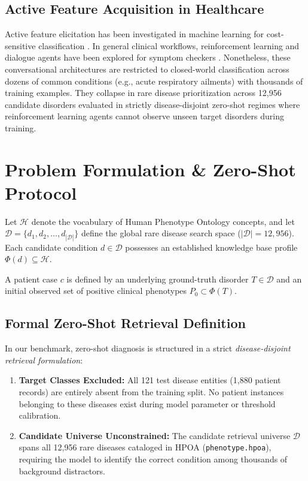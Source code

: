 \documentclass[conference]{IEEEtran}
\begin{document}
\subsection{Active Feature Acquisition in Healthcare}
Active feature elicitation has been investigated in machine learning for cost-sensitive classification \cite{greiner2002learning, ji2007cost}. In general clinical workflows, reinforcement learning and dialogue agents have been explored for symptom checkers \cite{tang2016inquire, kao2018context, peng2018refnr}. Nonetheless, these conversational architectures are restricted to closed-world classification across dozens of common conditions (e.g., acute respiratory ailments) with thousands of training examples. They collapse in rare disease prioritization across 12,956 candidate disorders evaluated in strictly disease-disjoint zero-shot regimes where reinforcement learning agents cannot observe unseen target disorders during training.

\section{Problem Formulation \& Zero-Shot Protocol}

Let $\mathcal{H}$ denote the vocabulary of Human Phenotype Ontology concepts, and let $\mathcal{D} = \{d_1, d_2, \dots, d_{|\mathcal{D}|}\}$ define the global rare disease search space ($|\mathcal{D}| = 12,956$). Each candidate condition $d \in \mathcal{D}$ possesses an established knowledge base profile $\Phi(d) \subseteq \mathcal{H}$.

A patient case $c$ is defined by an underlying ground-truth disorder $T \in \mathcal{D}$ and an initial observed set of positive clinical phenotypes $P_0 \subset \Phi(T)$.

\subsection{Formal Zero-Shot Retrieval Definition}
In our benchmark, zero-shot diagnosis is structured in a strict \textit{disease-disjoint retrieval formulation}:
\begin{enumerate}
    \item \textbf{Target Classes Excluded:} All 121 test disease entities (1,880 patient records) are entirely absent from the training split. No patient instances belonging to these diseases exist during model parameter or threshold calibration.
    \item \textbf{Candidate Universe Unconstrained:} The candidate retrieval universe $\mathcal{D}$ spans all 12,956 rare diseases cataloged in HPOA (\texttt{phenotype.hpoa}), requiring the model to identify the correct condition among thousands of background distractors.
\end{enumerate}
\end{document}
